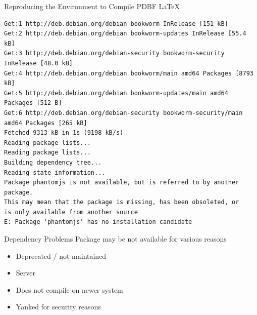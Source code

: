 \documentclass[aspectratio=169]{beamer}
\begin{document}
\begin{frame}[fragile]{Reproducing the Environment to Compile PDBF \LaTeX}
    \small
    \begin{verbatim}
Get:1 http://deb.debian.org/debian bookworm InRelease [151 kB]                  
Get:2 http://deb.debian.org/debian bookworm-updates InRelease [55.4 kB]              
Get:3 http://deb.debian.org/debian-security bookworm-security InRelease [48.0 kB]    
Get:4 http://deb.debian.org/debian bookworm/main amd64 Packages [8793 kB]
Get:5 http://deb.debian.org/debian bookworm-updates/main amd64 Packages [512 B]
Get:6 http://deb.debian.org/debian-security bookworm-security/main amd64 Packages [265 kB]
Fetched 9313 kB in 1s (9198 kB/s)
Reading package lists...
Reading package lists...
Building dependency tree...
Reading state information...
Package phantomjs is not available, but is referred to by another package.
This may mean that the package is missing, has been obsoleted, or
is only available from another source
E: Package 'phantomjs' has no installation candidate
    \end{verbatim}
\end{frame}




\begin{frame}{Dependency Problems}
    Package may be not available for various reasons
    \begin{itemize}
        \item Deprecated / not maintained
        \item Server
        \item Does not compile on newer system
        \item Yanked for security reasons
    \end{itemize}
\end{frame}
\end{document}
